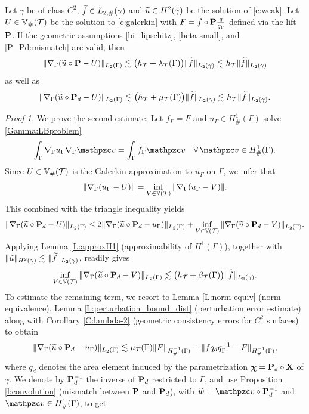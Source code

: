 \begin{theorem} \label{t:H1error}
Let $\gamma$ be of class $C^2$,  $\widetilde{f} \in L_{2,\#}(\gamma)$ and $\widetilde{u}\in H^2(\gamma)$ 
be the solution of \eqref{e:weak}.
%
Let $U \in \mathbb{V}_\#(\mathcal{T})$ be the solution to \eqref{e:galerkin} with $F =\widetilde{f} \circ {\bf P} \frac{q}{q_\Gamma}$ defined via the lift ${\bf P}$.
If the geometric assumptions \eqref{bi_lipschitz},
\eqref{beta-small}, and \eqref{P_Pd:mismatch} are valid,
then
$$
\| \nabla_\Gamma (\widetilde{u} \circ {\bf P} -U)\|_{L_2 (\Gamma)}\lesssim \big(h_{\mathcal{T}}+ \lambda_{\mathcal{T}}(\Gamma) \big)
\| \widetilde{f} \|_{L_{2}(\gamma)} \lesssim  h_{\mathcal{T}} \| \widetilde{f} \|_{L_{2}(\gamma)}
$$
as well as
$$
\| \nabla_\Gamma (\widetilde{u} \circ {\bf P}_d-U)\|_{L_2 (\Gamma)}\lesssim \big(h_{\mathcal{T}} + \mu_{\mathcal{T}}(\Gamma) \big)
\| \widetilde{f} \|_{L_{2}(\gamma)} \lesssim  h_{\mathcal{T}} \|\widetilde{f} \|_{L_{2}(\gamma)}.
$$
\end{theorem}
%
\noindent
{\it Proof 1.}
We prove the second estimate.
Let $f_\Gamma=F$ and $u_\Gamma \in H^1_\# (\Gamma)$ solve \eqref{Gamma:LBproblem}
%
$$
\int_\Gamma \nabla_\Gamma u_\Gamma \nabla_\Gamma \tv = \int_\Gamma f_\Gamma \tv
\quad \forall \, \tv \in H^1_\#(\Gamma).
$$
%
Since $U \in \mathbb{V}_\#(\mathcal{T})$ is the Galerkin approximation
to $u_\Gamma$ on $\Gamma$, we infer that
%
$$
\|\nabla_\Gamma(u_\Gamma-U)\| = \inf_{V \in \mathbb{V}(\mathcal{T})} \|\nabla_\Gamma(u_\Gamma-V)\|.
$$
%
This combined with the triangle inequality yields
%
\[
\|\nabla_\Gamma (\widetilde{u}\circ{\bf P}_d -U)\|_{L_2(\Gamma)} \le
2 \|\nabla_\Gamma(\widetilde{u}\circ{\bf P}_d-u_\Gamma)\|_{L_2(\Gamma)}
+  \inf_{V \in \mathbb{V}(\mathcal{T})} \|\nabla_\Gamma(\widetilde{u}\circ{\bf P}_d-V)\|_{L_2(\Gamma)}.
\]
%
Applying Lemma \ref{L:approxH1} (approximability of $H^1(\Gamma)$), together with
$\| \widetilde{u} \|_{H^2(\gamma)}\lesssim \| \widetilde{f} \|_{L_2(\gamma)}$,
readily gives
%
\[
\inf_{V \in \mathbb{V}(\mathcal{T})} \|\nabla_\Gamma(\widetilde{u}\circ{\bf P}_d-V)\|_{L_2(\Gamma)}
\lesssim \big(h_{\mathcal{T}} +\beta_{\mathcal{T}}(\Gamma) \big) \|\widetilde{f}\|_{L_2(\gamma)}.
\]
%
To estimate the remaining term, we resort to Lemma \ref{L:norm-equiv} (norm equivalence),
Lemma \ref{L:perturbation_bound_dist}
(perturbation error estimate) along with Corollary \ref{C:lambda-2} (geometric
consistency errors for $C^2$ surfaces) to obtain
%
\[
\|\nabla_\Gamma(\widetilde{u}\circ{\bf P}_d - u_\Gamma)\|_{L_2(\Gamma)}
\lesssim \mu_{\mathcal{T}}(\Gamma) \|F\|_{H_\#^{-1}(\Gamma)} + \|f q_d q_\Gamma^{-1}-F\|_{H_\#^{-1}(\Gamma)},
\]
%
where $q_d$ denotes the area element induced by the parametrization
${\boldsymbol \chi}={\bf P}_d\circ{\bf X}$ of $\gamma$.
We denote by ${\bf P}_d^{-1}$ the inverse of ${\bf P}_d$ restricted to $\Gamma$, and
use Proposition \ref{l:convolution} (mismatch between ${\bf P}$ and ${\bf P}_d$),
with $\widetilde{w}=\tv \circ \bP_d^{-1}$ and $\tv\in H^1_\#(\Gamma)$, to get
